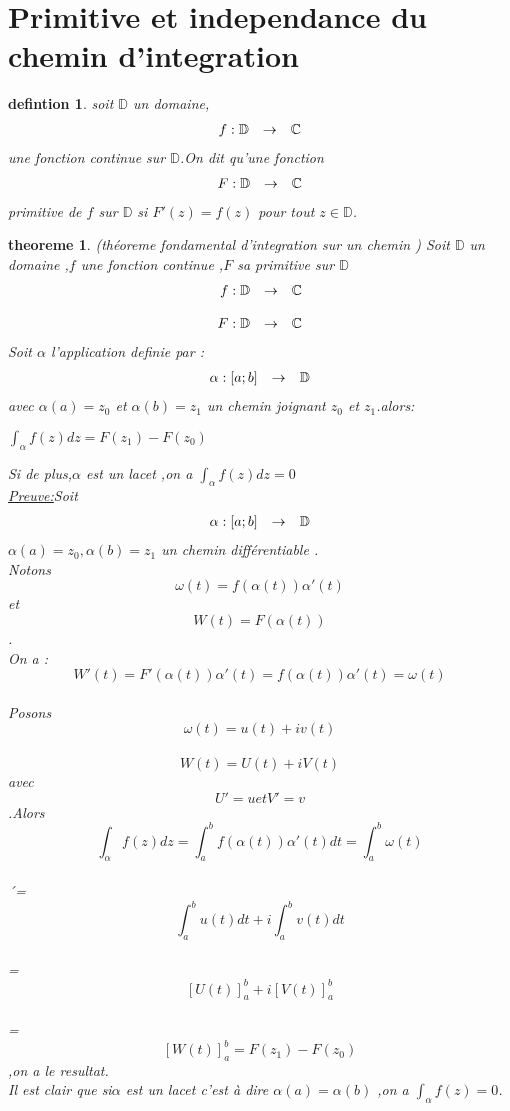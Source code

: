 \documentclass[a4paper,12pt]{book}
\newtheorem{definition}{defintion}[section]
\newtheorem{theoreme}{theoreme}[section]
\begin{document}
   \section{Primitive et independance du chemin d'integration}
     \begin{definition}
     soit $\mathbb{D}$ un domaine,
    \[
         \begin{array}{r c l}
         	f: \mathbb{D} & \to & \mathbb{C}
         	
         \end{array}
    \]une fonction continue sur $\mathbb{D}$.On dit qu'une fonction 
    \[
         \begin{array}{r c l}
         F:\mathbb{D} & \to & \mathbb{C}
        \end{array}
    \] primitive de $f$ sur $\mathbb{D}$ si $F'(z)=f(z)$ pour tout $z\in \mathbb{D} $.
\end{definition}
    \begin{theoreme}{(théoreme fondamental d'integration sur un chemin )}
    	Soit $\mathbb{D}$ un domaine ,$f$ une fonction continue ,$F$ sa primitive sur $\mathbb{D}$
    	\[
    	   \begin{array}{r c l}
    	   	f: \mathbb{D}& \to & \mathbb{C} \\ \\ F : \mathbb{D} & \to & \mathbb{C}
    	   \end{array}
    	\]Soit $\alpha$ l'application definie par :
    	\[
    	\begin{array}{r c l}
    		\alpha:[a;b] & \to & \mathbb{D} \\
    	\end{array}\]
    avec $\alpha(a)= z_0$ et $\alpha(b)=z_1$ un chemin joignant $z_0$ et $z_1$.alors:\\
    \begin{center}
    $\int_{\alpha}f(z)dz = F(z_1)-F(z_0)$
\end{center}
Si de plus,$\alpha$ est un lacet ,on a $\int_{\alpha} f(z)dz=0$\\
\underline{Preuve:}Soit \[
\begin{array}{r c l}
	\alpha:[a;b] & \to & \mathbb{D} 
\end{array}\]$\alpha(a)=z_0,\alpha(b)=z_1$ un chemin différentiable .\\Notons $$\omega(t)=f(\alpha(t))\alpha'(t)$$
et $$W(t)=F(\alpha(t))$$.\\
On a : $$W'(t)= F'(\alpha(t))\alpha'(t)=f(\alpha(t))\alpha'(t)=\omega(t)$$\\
Posons $$\omega(t) = u(t) + iv(t)$$ \\ $$ W(t)= U(t)+iV(t)$$ avec $$ U'=u et V'=v $$.Alors\\
$$\int_{\alpha}f(z)dz=\int_{a}^{b}f(\alpha(t))\alpha'(t)dt=\int_{a}^{b}\omega(t)$$\\
´= $$\int_{a}^{b}u(t)dt + i\int_{a}^{b}v(t)dt$$\\
=$$[U(t)]^b_a + i[V(t)]^b_a$$\\
=$$[W(t)]^b_a=F(z_1)-F(z_0)$$,on a le resultat.\\
Il est clair que si$\alpha$ est un lacet c'est à dire $\alpha(a)=\alpha(b)$ ,on a $\int_{\alpha}f(z)=0$.
       \end{theoreme}
\end{document}
